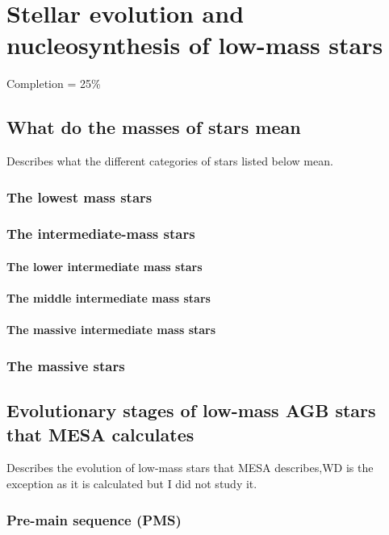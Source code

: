 \chapter{Stellar evolution and nucleosynthesis of low-mass stars}

Completion = 25\%

\section{What do the masses of stars mean}

Describes what the different categories of stars listed below mean.

\subsection{The lowest mass stars}

\subsection{The intermediate-mass stars}

\subsubsection{The lower intermediate mass stars}

\subsubsection{The middle intermediate mass stars}

\subsubsection{The massive intermediate mass stars}

\subsection{The massive stars}

\section{Evolutionary stages of low-mass AGB stars that MESA calculates}

Describes the evolution of low-mass stars that MESA describes,WD is the exception as it is calculated but I did not study it.

\subsection{Pre-main sequence (PMS)}

